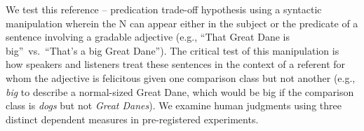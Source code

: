 \documentclass[10pt,letterpaper]{article}
\begin{document}

We test this reference -- predication trade-off hypothesis using a syntactic manipulation wherein the N can appear either in the subject or the predicate of a sentence involving a gradable adjective (e.g., ``That Great Dane is big''~vs.~``That's a big Great Dane''). 
The critical test of this manipulation is how speakers and listeners treat these sentences in the context of a referent for whom the adjective is felicitous given one comparison class but not another (e.g., \emph{big} to describe a normal-sized Great Dane, which would be big if the comparison class is \emph{dogs} but not \emph{Great Danes}). 
We examine human judgments using three distinct dependent measures in pre-registered experiments. 
\end{document}
